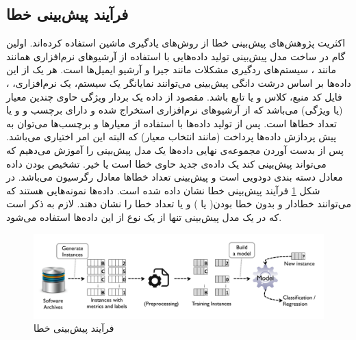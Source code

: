 \subsection{فرآیند پیش‌بینی خطا}
اکثریت پژوهش‌های پیش‌بینی خطا از روش‌های یادگیری ماشین  استفاده کرده‌اند. اولین گام در ساخت مدل پیش‌بینی تولید داده‌هایی با استفاده از آرشیو‌های نرم‌افزاری همانند  مانند ، سیستم‌های ردگیری مشکلات  مانند جیرا و آرشیو ایمیل‌ها است. هر یک از این داده‌ها بر اساس درشت دانگی پیش‌بینی می‌توانند نمایانگر یک سیستم، یک  نرم‌افزاری، ، فایل کد منبع، کلاس و یا تابع باشد. مقصود از داده یک بردار ویژگی حاوی چندین معیار (یا ویژگی) می‌باشد که از آرشیو‌های نرم‌افزاری استخراج شده و دارای برچسب  و    و یا تعداد خطاها است. پس از تولید داده‌ها با استفاده از معیارها و برچسب‌ها می‌توان به پیش پردازش داده‌ها پرداخت (مانند انتخاب معیار) که البته این امر اختیاری می‌باشد. پس از بدست آوردن مجموعه‌ی نهایی داده‌ها یک مدل پیش‌بینی را آموزش می‌دهیم که می‌تواند پیش‌بینی کند یک داده‌ی جدید حاوی خطا است یا خیر. تشخیص  بودن داده معادل دسته بندی دودویی است و پیش‌بینی تعداد خطاها معادل رگرسیون می‌باشد. در شکل \ref{fig:prediction-process} فرآیند پیش‌بینی خطا نشان داده شده است. داده‌ها نمونه‌هایی هستند که می‌توانند خطادار  و بدون  خطا  بودن(    یا    ) و یا تعداد خطا را نشان دهند. لازم به ذکر است که در یک مدل پیش‌بینی تنها از یک نوع از این داده‌ها استفاده می‌شود.

\begin{figure}[H]
	\centering
	\includegraphics[width=1.0\textwidth]{img/prediction-process.PNG}
	 \caption{فرآیند پیش‌بینی خطا \cite{nam2014survey}}
	\label{fig:prediction-process}
\end{figure}
